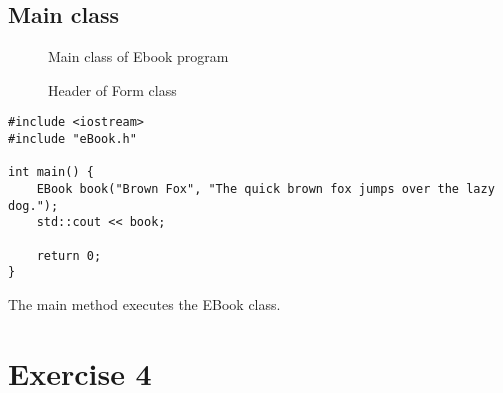 \documentclass{article}
\begin{document}
\subsection{Main class}
\begin{figure}
\scriptsize{\caption{Main class of Ebook program}}
\scriptsize{\caption{Header of Form class}}
\end{figure}
\begin{lstlisting}
#include <iostream>
#include "eBook.h"

int main() {
	EBook book("Brown Fox", "The quick brown fox jumps over the lazy dog.");
	std::cout << book; 

	return 0; 
}
\end{lstlisting}
\normalsize{The main method executes the EBook class.}
\section{Exercise 4}

\end{document}
